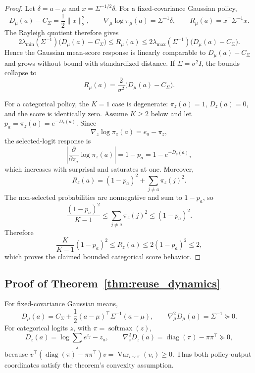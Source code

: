 \documentclass{article}
\theoremstyle{plain}
\theoremstyle{definition}
\theoremstyle{remark}
\begin{document}
\begin{proof}
Let \(\delta=a-\mu\) and \(x=\Sigma^{-1/2}\delta\). For a fixed-covariance
Gaussian policy,
\[
D_\mu(a)-C_\Sigma
=
\frac12\|x\|_2^2,
\qquad
\nabla_\mu\log\pi_\mu(a)
=
\Sigma^{-1}\delta,
\qquad
R_\mu(a)
=
x^\top\Sigma^{-1}x.
\]
The Rayleigh quotient therefore gives
\[
2\lambda_{\min}(\Sigma^{-1})
\bigl(D_\mu(a)-C_\Sigma\bigr)
\le
R_\mu(a)
\le
2\lambda_{\max}(\Sigma^{-1})
\bigl(D_\mu(a)-C_\Sigma\bigr).
\]
Hence the Gaussian mean-score response is linearly comparable to
\(D_\mu(a)-C_\Sigma\) and grows without bound with standardized distance.
If \(\Sigma=\sigma^2I\), the bounds collapse to
\[
R_\mu(a)
=
\frac{2}{\sigma^2}
\bigl(D_\mu(a)-C_\Sigma\bigr).
\]

For a categorical policy, the \(K=1\) case is degenerate:
\(\pi_z(a)=1\), \(D_z(a)=0\), and the score is identically zero.
Assume \(K\ge2\) below and let
\(p_a=\pi_z(a)=e^{-D_z(a)}\). Since
\[
\nabla_z\log\pi_z(a)=e_a-\pi_z,
\]
the selected-logit response is
\[
\left|
\frac{\partial}{\partial z_a}\log\pi_z(a)
\right|
=
1-p_a
=
1-e^{-D_z(a)},
\]
which increases with surprisal and saturates at one. Moreover,
\[
R_z(a)
=
(1-p_a)^2+\sum_{j\ne a}\pi_z(j)^2.
\]
The non-selected probabilities are nonnegative and sum to \(1-p_a\), so
\[
\frac{(1-p_a)^2}{K-1}
\le
\sum_{j\ne a}\pi_z(j)^2
\le
(1-p_a)^2.
\]
Therefore
\[
\frac{K}{K-1}(1-p_a)^2
\le
R_z(a)
\le
2(1-p_a)^2
\le
2,
\]
which proves the claimed bounded categorical score behavior.
\end{proof}

\subsection{Proof of Theorem~\ref{thm:reuse_dynamics}}
\label{app:reuse_dynamics}

For fixed-covariance Gaussian means,
\[
D_\mu(a)
=
C_\Sigma+\frac12(a-\mu)^\top\Sigma^{-1}(a-\mu),
\qquad
\nabla_\mu^2D_\mu(a)=\Sigma^{-1}\succeq0.
\]
For categorical logits \(z\), with \(\pi=\operatorname{softmax}(z)\),
\[
D_z(a)
=
\log\sum_j e^{z_j}-z_a,
\qquad
\nabla_z^2D_z(a)
=
\operatorname{diag}(\pi)-\pi\pi^\top\succeq0,
\]
because
\(v^\top(\operatorname{diag}(\pi)-\pi\pi^\top)v
=\operatorname{Var}_{i\sim\pi}(v_i)\ge0\).
Thus both policy-output coordinates satisfy the theorem's convexity
assumption.
\end{document}
